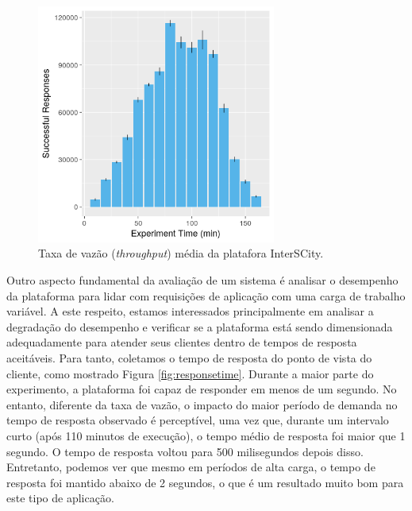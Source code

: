 \begin{figure}[ht]
	\centering
	\includegraphics[width=0.7\textwidth]{figuras/throughput.png}
    \caption{Taxa de vazão (\textit{throughput}) média da platafora InterSCity.}
	\label{fig:throughput}
\end{figure}


Outro aspecto fundamental da avaliação de um sistema é analisar o desempenho da plataforma para lidar com requisições de aplicação com uma carga de trabalho variável.
A este respeito, estamos interessados principalmente em analisar a degradação do desempenho e verificar se a plataforma está sendo dimensionada adequadamente para atender seus clientes dentro de tempos
de resposta aceitáveis.
Para tanto, coletamos o tempo de resposta do ponto de vista do cliente, como mostrado Figura \ref{fig:responsetime}.
Durante a maior parte do experimento, a plataforma foi capaz de responder em menos de um segundo.
No entanto, diferente da taxa de vazão, o impacto do maior período de demanda no tempo de resposta observado é perceptível, uma vez que, durante um intervalo curto (após 110 minutos de execução),
o tempo médio de resposta foi maior que 1 segundo.
O tempo de resposta voltou para 500 milisegundos depois disso.
Entretanto, podemos ver que mesmo em períodos de alta carga, o tempo de resposta foi mantido abaixo de 2 segundos, o que é um resultado muito bom para este tipo de aplicação.


